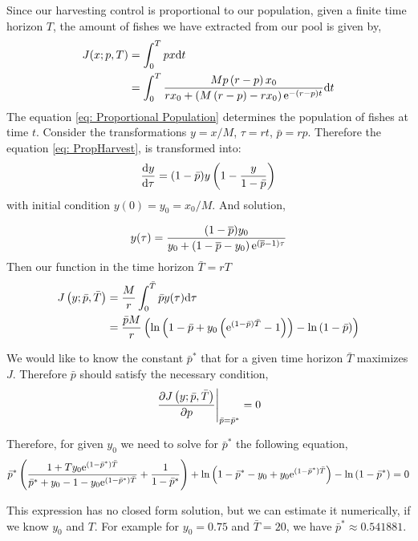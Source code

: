 Since our harvesting control is proportional to our population, given a finite time horizon $T$, the amount of fishes we have extracted from our pool is given by,
\begin{align}
	J(x;p,T)&=\int_{0}^{T} p x \mathrm{d} t \nonumber \\
			&=\int_{0}^{T} \frac{M p\left(r-p\right)x_0}{rx_0+\left(M\left(r-p\right)-rx_0\right)\mathrm{e}^{-(r-p) t}} \mathrm{d} t \nonumber
\end{align}
The equation \ref{eq: Proportional Population} determines the population of fishes at time $t$. Consider the transformations $y=x/M$, $\tau=rt$, $\bar{p}=rp$. Therefore the equation \ref{eq: PropHarvest}, is transformed into:
\begin{equation}
\frac{\mathrm{d} y}{{\mathrm{d} \tau}}=(1-\bar{p})y\left(1-\frac{y}{1-\bar{p}}\right)
\end{equation}
with initial condition $y(0)=y_0=x_0/M$. And solution,

\begin{equation}
	y(\tau)=\frac{(1-\overline p)y_0}{y_0+\left(1-\overline p-y_0\right)\mathrm{e}^{(\overline p-1)\tau}}
\end{equation}
Then our function in the time horizon $\bar{T}=rT$
\begin{align}
J\left(y;\bar{p},\bar{T}\right)&=\frac{M}{r}\int_0^{\bar{T}}\bar{p}y(\tau)\mathrm{d} \tau	\\
&=\frac{\bar{p}M}{r}\left(\ln\left(1-\bar{p}+y_0\left(\mathrm{e}^{(1-\bar{p})\bar{T}}-1\right)\right)-\ln\left(1-\bar{p}\right)\right)
\end{align}

We would like to know the constant $\bar{p}^*$ that for a given time horizon $\bar{T}$ maximizes $J$. Therefore $\bar{p}$ should satisfy the necessary condition,
\begin{equation}
\left.\frac{\partial J\left(y;\bar{p},\bar{T}\right)}{{\partial p}}\right|_{\bar{p}=\bar{p}^*}=0
\end{equation}

Therefore, for given $y_0$ we need to solve for $\bar{p}^*$ the following equation,
\begin{equation}
\bar{p}^* \left(\frac{1+Ty_0\mathrm{e}^{\left(1-\bar{p}^*\right)\bar{T}}}{\bar{p}^*+y_0-1 -y_0\mathrm{e}^{(1-\bar{p}^*)\bar{T}}}+\frac{1}{1-\bar{p}^*}\right)+\ln
\left(1-\bar{p}^*-y_0 +y_0\mathrm{e}^{(1-\bar{p}^*)\bar{T}}\right)-\ln\left(1-\bar{p}^*\right)=0 \label{eq: Nonlinear equation}
\end{equation}

This expression has no closed form solution, but we can estimate it numerically, if we know $y_0$ and $T$. For example for $y_0=0.75$ and $\bar{T}=20$, we have
$\bar{p}^* \approx 0.541881$.


